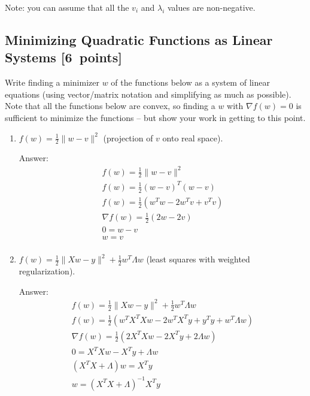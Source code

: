 \documentclass{article}
\newcommand{\blu}[1]{{\textcolor{blu}{#1}}}
\newenvironment{answer}{\par\begingroup\color{gre}Answer: }{\endgroup}
\let\ask\blu
\newcommand\pts[1]{\textcolor{pointscolour}{[#1~points]}}
\newcommand{\norm}[1]{\lVert #1 \rVert}
\begin{document}
Note: you can assume that all the $v_i$ and $\lambda_i$ values are non-negative.
\newpage
\subsection{Minimizing Quadratic Functions as Linear Systems \pts{6}} \label{sec:lin-sys}

\ask{Write finding a minimizer $w$ of the functions below as a system of linear equations} (using vector/matrix notation and simplifying as much as possible). Note that all the functions below are convex, so finding a $w$ with $\nabla f(w) = 0$ is sufficient to minimize the functions -- but show your work in getting to this point.

\begin{enumerate}
\item $f(w) = \frac{1}{2} \norm{w-v}^2$ (projection of $v$ onto real space).
    \begin{answer}
    \begin{gather*}
    f(w) = \frac{1}{2} \norm{w-v}^2 \\ 
    f(w) = \frac{1}{2} (w-v)^T (w-v) \\
    f(w) = \frac{1}{2} (w^Tw - 2w^Tv + v^Tv) \\
    \nabla f(w) = \frac{1}{2} (2w - 2v) \\
    0 = w - v \\
    w = v \\
    \end{gather*}
    \end{answer}
    
\item $f(w)= \frac{1}{2} \norm{Xw - y}^2 + \frac{1}{2} w^T\Lambda w$ (least squares with weighted regularization).
    \begin{answer}
    \begin{gather*}
    f(w)= \frac{1}{2}  \norm{Xw - y}^2 + \frac{1}{2} w^T\Lambda w \\
    f(w)= \frac{1}{2} \left( w^TX^TXw - 2w^TX^Ty + y^Ty + w^T\Lambda w \right) \\
    \nabla f(w)= \frac{1}{2} \left( 2X^TXw - 2X^Ty + 2\Lambda w \right) \\
    0= X^TXw - X^Ty + \Lambda w \\
    \left( X^TX + \Lambda \right)w = X^Ty\\
    w = \left( X^TX + \Lambda \right)^{-1}X^Ty\\
    \end{gather*}
    \end{answer}


\end{enumerate}
\end{document}
